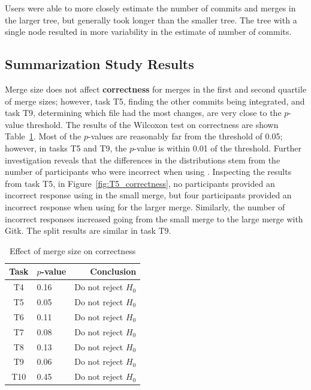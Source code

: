 Users were able to more closely estimate the number of commits and
merges in the larger tree, but generally took longer than the smaller
tree. The tree with a single node resulted in more variability in the
estimate of number of commits.

\subsection{Summarization Study Results}
\label{sub:summarization_results}

Merge size does not affect \textbf{correctness} for merges in the first
and second quartile of merge sizes; however, task T5,
finding the other commits being integrated, and task T9, determining
which file had the most changes, are very close to the $p$-value
threshold. The results of the Wilcoxon test on correctness are shown
Table~\ref{tab:cross_commit_correctness}. Most of the $p$-values are
reasonably far from the threshold of 0.05; however, in tasks T5 and T9,
the $p$-value is within 0.01 of the threshold. Further investigation
reveals that the differences in the distributions stem from the number
of participants who were incorrect when using \tool{}. Inspecting the
results from task T5, in Figure~\ref{fig:T5_correctness}, no
participants provided an incorrect response using \tool{} in the small
merge, but four participants provided an incorrect response when using
\tool{} for the larger merge. Similarly, the number of incorrect
responses increased going from the small merge to the large merge with
Gitk. The split results are similar in task T9.

\begin{table}[htpb]
  \centering
  \caption{Effect of merge size on correctness}
  \label{tab:cross_commit_correctness}
  \begin{tabular}{clr}
    \toprule
    Task & $p$-value & Conclusion\\\midrule
    T4   & 0.16      & Do not reject $H_0$\\
    T5   & 0.05      & Do not reject $H_0$\\
    T6   & 0.11      & Do not reject $H_0$\\
    T7   & 0.08      & Do not reject $H_0$\\
    T8   & 0.13      & Do not reject $H_0$\\
    T9   & 0.06      & Do not reject $H_0$\\
    T10  & 0.45      & Do not reject $H_0$\\
    \bottomrule
  \end{tabular}
\end{table}


